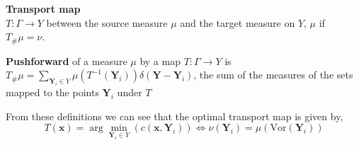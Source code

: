 \begin{definition} 
	\textbf{Transport map} \\ $T: \Gamma \rightarrow Y$ between the source measure $\mu$ and the target measure on $Y$, $\mu$ if $T_{\#}\mu = \nu$.\\
\end{definition}
\begin{definition}
	\textbf{Pushforward} of a measure $\mu$ by a map $T: \Gamma \rightarrow Y$ is $T_{\#}\mu = \sum_{\bm{Y}_i \in Y} \mu \left( T^{-1}(\bm{Y}_i) \right) \delta(\bm{Y}-{\bm{Y}_i})$, the sum of the measures of the sets mapped to the points $\bm{Y}_i$ under $T$
\end{definition}
From these definitions we can see that the optimal transport map is given by,
\begin{equation}
	T(\bm{x}) = \arg\min_{\bm{Y}_i\in Y}\left(c(\bm{x},\bm{Y}_i)\right) \iff \nu(\bm{Y}_i) = \mu\left(\text{Vor}(\bm{Y}_i)\right)
\end{equation}
